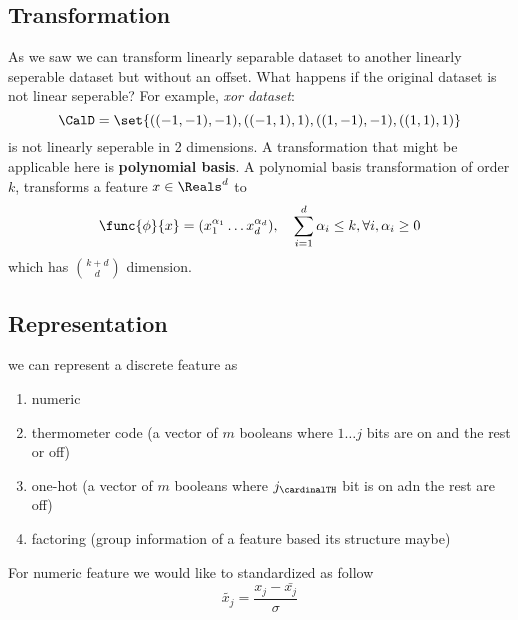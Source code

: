 \subsection{Transformation}
As we saw we can transform linearly separable dataset to another linearly seperable dataset but without an offset. What happens if the original dataset is not linear seperable? For example, \textit{xor dataset}:
\begin{equation*}
    \CalD = \set{((-1,-1),-1), ((-1,1), 1) , ((1,-1),-1) , ((1,1),1)}
\end{equation*}
is not linearly seperable in 2 dimensions. A transformation that might be applicable here is \textbf{polynomial basis}. A polynomial basis transformation of order \(k\), transforms a feature \(x \in \Reals^d\) to
\begin{equation*}
    \func{\phi}{x} = ( x_1^{\alpha_1} \dots x_d^{\alpha_d}) , \quad \sum_{i = 1}^d \alpha_i \leq k , \forall i, \alpha_i \geq 0
\end{equation*}
which has \(\binom{k + d }{d }\) dimension.

\subsection{Representation}
we can represent a discrete feature as
\begin{enumerate}
    \item numeric
    \item thermometer code (a vector of \(m\) booleans where \(1\dots j\) bits are on and the rest or off)
    \item one-hot (a vector of \(m\) booleans where \(j_{\cardinalTH}\) bit is on adn the rest are off)
    \item factoring (group information of a feature based its structure maybe)
\end{enumerate}

For numeric feature we would like to standardized as follow
\begin{equation*}
    \tilde{x_j}  = \dfrac{x_j - \bar{x_j}}{\sigma}
\end{equation*}